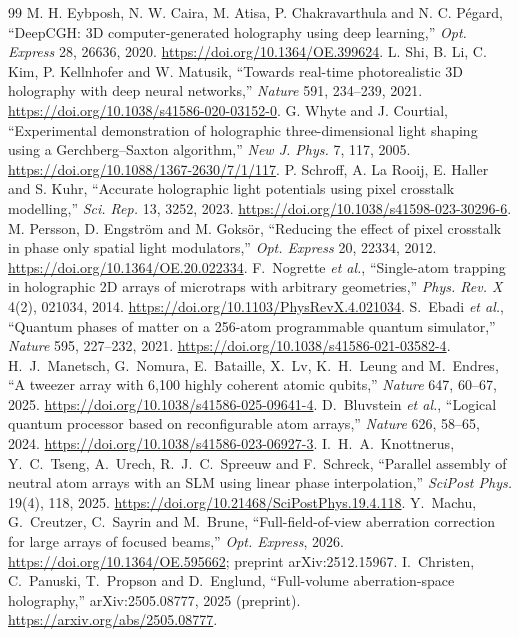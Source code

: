 \begin{thebibliography}{99}
 M. H. Eybposh, N. W. Caira, M. Atisa, P. Chakravarthula and N. C. P\'egard, ``DeepCGH: 3D computer-generated holography using deep learning,'' \emph{Opt. Express} 28, 26636, 2020. \url{https://doi.org/10.1364/OE.399624}.
 L. Shi, B. Li, C. Kim, P. Kellnhofer and W. Matusik, ``Towards real-time photorealistic 3D holography with deep neural networks,'' \emph{Nature} 591, 234--239, 2021. \url{https://doi.org/10.1038/s41586-020-03152-0}.
 G. Whyte and J. Courtial, ``Experimental demonstration of holographic three-dimensional light shaping using a Gerchberg--Saxton algorithm,'' \emph{New J. Phys.} 7, 117, 2005. \url{https://doi.org/10.1088/1367-2630/7/1/117}.
 P. Schroff, A. La Rooij, E. Haller and S. Kuhr, ``Accurate holographic light potentials using pixel crosstalk modelling,'' \emph{Sci. Rep.} 13, 3252, 2023. \url{https://doi.org/10.1038/s41598-023-30296-6}.
 M. Persson, D. Engstr\"om and M. Goks\"or, ``Reducing the effect of pixel crosstalk in phase only spatial light modulators,'' \emph{Opt. Express} 20, 22334, 2012. \url{https://doi.org/10.1364/OE.20.022334}.
 F.~Nogrette \emph{et al.}, ``Single-atom trapping in holographic 2D arrays of microtraps with arbitrary geometries,'' \emph{Phys. Rev. X} 4(2), 021034, 2014. \url{https://doi.org/10.1103/PhysRevX.4.021034}.
 S.~Ebadi \emph{et al.}, ``Quantum phases of matter on a 256-atom programmable quantum simulator,'' \emph{Nature} 595, 227--232, 2021. \url{https://doi.org/10.1038/s41586-021-03582-4}.
 H.~J.~Manetsch, G.~Nomura, E.~Bataille, X.~Lv, K.~H.~Leung and M.~Endres, ``A tweezer array with 6,100 highly coherent atomic qubits,'' \emph{Nature} 647, 60--67, 2025. \url{https://doi.org/10.1038/s41586-025-09641-4}.
 D.~Bluvstein \emph{et al.}, ``Logical quantum processor based on reconfigurable atom arrays,'' \emph{Nature} 626, 58--65, 2024. \url{https://doi.org/10.1038/s41586-023-06927-3}.
 I.~H.~A.~Knottnerus, Y.~C.~Tseng, A.~Urech, R.~J.~C.~Spreeuw and F.~Schreck, ``Parallel assembly of neutral atom arrays with an SLM using linear phase interpolation,'' \emph{SciPost Phys.} 19(4), 118, 2025. \url{https://doi.org/10.21468/SciPostPhys.19.4.118}.
 Y.~Machu, G.~Creutzer, C.~Sayrin and M.~Brune, ``Full-field-of-view aberration correction for large arrays of focused beams,'' \emph{Opt. Express}, 2026. \url{https://doi.org/10.1364/OE.595662}; preprint arXiv:2512.15967.
 I.~Christen, C.~Panuski, T.~Propson and D.~Englund, ``Full-volume aberration-space holography,'' arXiv:2505.08777, 2025 (preprint). \url{https://arxiv.org/abs/2505.08777}.

\end{thebibliography}
